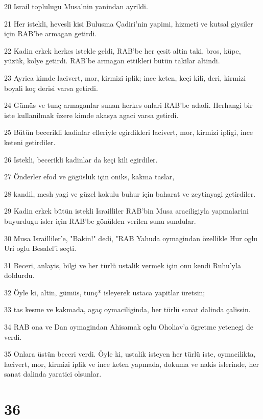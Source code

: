 \par 20 Israil toplulugu Musa'nin yanindan ayrildi.
\par 21 Her istekli, hevesli kisi Bulusma Çadiri'nin yapimi, hizmeti ve kutsal giysiler için RAB'be armagan getirdi.
\par 22 Kadin erkek herkes istekle geldi, RAB'be her çesit altin taki, bros, küpe, yüzük, kolye getirdi. RAB'be armagan ettikleri bütün takilar altindi.
\par 23 Ayrica kimde lacivert, mor, kirmizi iplik; ince keten, keçi kili, deri, kirmizi boyali koç derisi varsa getirdi.
\par 24 Gümüs ve tunç armaganlar sunan herkes onlari RAB'be adadi. Herhangi bir iste kullanilmak üzere kimde akasya agaci varsa getirdi.
\par 25 Bütün becerikli kadinlar elleriyle egirdikleri lacivert, mor, kirmizi ipligi, ince keteni getirdiler.
\par 26 Istekli, becerikli kadinlar da keçi kili egirdiler.
\par 27 Önderler efod ve gögüslük için oniks, kakma taslar,
\par 28 kandil, mesh yagi ve güzel kokulu buhur için baharat ve zeytinyagi getirdiler.
\par 29 Kadin erkek bütün istekli Israilliler RAB'bin Musa araciligiyla yapmalarini buyurdugu isler için RAB'be gönülden verilen sunu sundular.
\par 30 Musa Israilliler'e, "Bakin!" dedi, "RAB Yahuda oymagindan özellikle Hur oglu Uri oglu Besalel'i seçti.
\par 31 Beceri, anlayis, bilgi ve her türlü ustalik vermek için onu kendi Ruhu'yla doldurdu.
\par 32 Öyle ki, altin, gümüs, tunç* isleyerek ustaca yapitlar üretsin;
\par 33 tas kesme ve kakmada, agaç oymaciliginda, her türlü sanat dalinda çalissin.
\par 34 RAB ona ve Dan oymagindan Ahisamak oglu Oholiav'a ögretme yetenegi de verdi.
\par 35 Onlara üstün beceri verdi. Öyle ki, ustalik isteyen her türlü iste, oymacilikta, lacivert, mor, kirmizi iplik ve ince keten yapmada, dokuma ve nakis islerinde, her sanat dalinda yaratici olsunlar.

\chapter{36}

